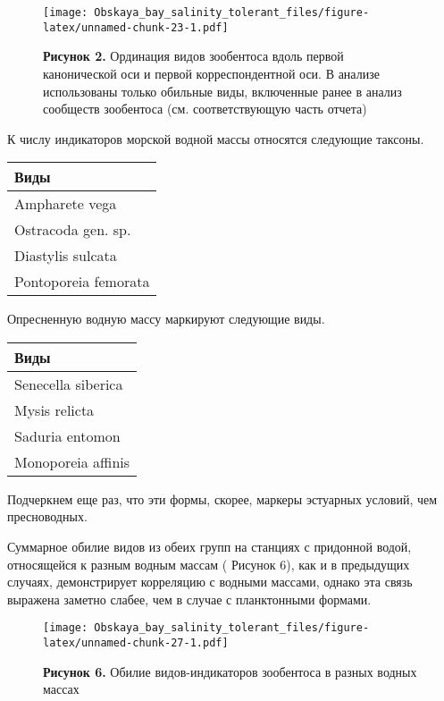 \documentclass[
]{article}
\begin{document}
\begin{figure}
\centering
\texttt{[image: Obskaya\_bay\_salinity\_tolerant\_files/figure-latex/unnamed-chunk-23-1.pdf]}
\caption{\textbf{Рисунок 2.} Ординация видов зообентоса вдоль первой
канонической оси и первой корреспондентной оси. В анализе использованы
только обильные виды, включенные ранее в анализ сообществ зообентоса
(см. соответствующую часть отчета)}
\end{figure}

К числу индикаторов морской водной массы относятся следующие таксоны.

\begin{longtable}[]{@{}l@{}}
\toprule
Виды \\
\midrule
\endhead
Ampharete vega \\
Ostracoda gen. sp. \\
Diastylis sulcata \\
Pontoporeia femorata \\
\bottomrule
\end{longtable}

Опресненную водную массу маркируют следующие виды.

\begin{longtable}[]{@{}l@{}}
\toprule
Виды \\
\midrule
\endhead
Senecella siberica \\
Mysis relicta \\
Saduria entomon \\
Monoporeia affinis \\
\bottomrule
\end{longtable}

Подчеркнем еще раз, что эти формы, скорее, маркеры эстуарных условий,
чем пресноводных.

Суммарное обилие видов из обеих групп на станциях с придонной водой,
относящейся к разным водным массам ( Рисунок 6), как и в предыдущих
случаях, демонстрирует корреляцию с водными массами, однако эта связь
выражена заметно слабее, чем в случае с планктонными формами.

\begin{figure}
\centering
\texttt{[image: Obskaya\_bay\_salinity\_tolerant\_files/figure-latex/unnamed-chunk-27-1.pdf]}
\caption{\textbf{Рисунок 6.} Обилие видов-индикаторов зообентоса в
разных водных массах}
\end{figure}
\end{document}
